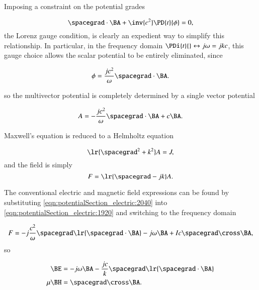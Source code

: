 Imposing a constraint on the potential grades

\begin{dmath}\label{eqn:potentialSection_electric:2020}
\spacegrad \cdot \BA + \inv{c^2} \PD{t}{\phi} = 0,
\end{dmath}
the Lorenz gauge condition, is clearly an expedient way to simplify this relationship.
In particular,
in the frequency domain \( \PDi{t}{} \leftrightarrow j \omega = j k c \), this gauge choice allows the scalar potential to be entirely eliminated, since

\begin{dmath}\label{eqn:potentialSection_electric:2040}
\phi = \frac{j c^2}{\omega} \spacegrad \cdot \BA.
\end{dmath}

so the multivector potential is completely determined by a single vector potential

\begin{dmath}\label{eqn:potentialSection_electric:2060}
A =
-\frac{j c^2}{\omega} \spacegrad \cdot \BA + c \BA.
\end{dmath}

Maxwell's equation is reduced to a Helmholtz equation

\begin{dmath}\label{eqn:potentialSection_electric:2080}
\lr{ \spacegrad^2 + k^2} A = J,
\end{dmath}
and the field is simply
\begin{dmath}\label{eqn:potentialSection_electric:2100}
F = \lr{ \spacegrad - j k } A.
\end{dmath}

The conventional electric and magnetic field expressions can be found by substituting \cref{eqn:potentialSection_electric:2040} into
\cref{eqn:potentialSection_electric:1920} and switching to the frequency domain

\begin{dmath}\label{eqn:potentialSection_electric:2380}
F
=
-j \frac{c^2}{\omega} \spacegrad \lr{ \spacegrad \cdot \BA }
-j \omega \BA
+ I c \spacegrad \cross \BA,
\end{dmath}
%
%
so

\begin{dmath}\label{eqn:potentialSection_electric:2320}
\begin{aligned}
\BE &= -j \omega \BA -\frac{j c}{k} \spacegrad \lr{ \spacegrad \cdot \BA } \\
\mu \BH &= \spacegrad \cross \BA.
\end{aligned}
\end{dmath}
